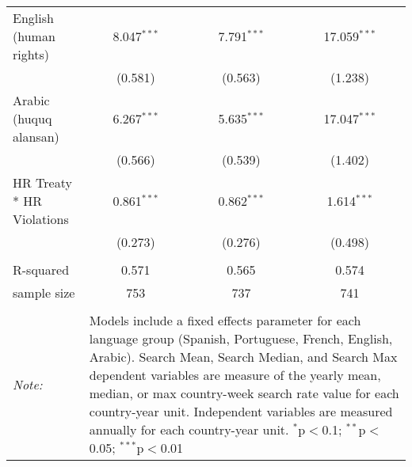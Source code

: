 \begin{table}[!htbp]
\begin{tabular}{@{\extracolsep{5pt}}lccc}
  English (human rights) & 8.047$^{***}$ & 7.791$^{***}$ & 17.059$^{***}$ \\ 
  & (0.581) & (0.563) & (1.238) \\ 
  Arabic (huquq alansan) & 6.267$^{***}$ & 5.635$^{***}$ & 17.047$^{***}$ \\ 
  & (0.566) & (0.539) & (1.402) \\ 
  HR Treaty * HR Violations & 0.861$^{***}$ & 0.862$^{***}$ & 1.614$^{***}$ \\ 
  & (0.273) & (0.276) & (0.498) \\ 
 \hline \\[-1.8ex] 
R-squared  & 0.571 & 0.565 & 0.574 \\ 
sample size  & 753 & 737 & 741 \\ 
\hline 
\hline \\[-1.8ex] 
\textit{Note:}  & \multicolumn{3}{l}{\parbox[t]{8cm}{Models include a fixed effects parameter for each language group (Spanish, Portuguese, French, English, Arabic). Search Mean, Search Median, and Search Max dependent variables are measure of the yearly mean, median, or max country-week search rate value for each country-year unit. Independent variables are measured annually for each country-year unit. $^{*}$p$<$0.1; $^{**}$p$<$0.05; $^{***}$p$<$0.01}} \\ 
\end{tabular} 
\end{table} 
